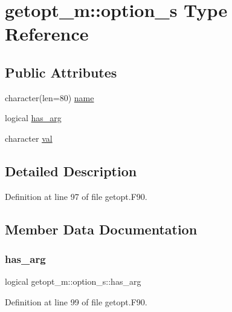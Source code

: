 \hypertarget{structgetopt__m_1_1option__s}{}\section{getopt\+\_\+m\+:\+:option\+\_\+s Type Reference}
\label{structgetopt__m_1_1option__s}
\subsection*{Public Attributes}
\begin{DoxyCompactItemize}
\item 
character(len=80) \mbox{\hyperlink{structgetopt__m_1_1option__s_a4ec49c9f40fe4c0f6e3dcc6849dea36d}{name}}
\item 
logical \mbox{\hyperlink{structgetopt__m_1_1option__s_a4620b3c1afad7dc95403eb88a4a369d6}{has\+\_\+arg}}
\item 
character \mbox{\hyperlink{structgetopt__m_1_1option__s_a25ab80bd4f202b256c65c31ea7d1798b}{val}}
\end{DoxyCompactItemize}


\subsection{Detailed Description}


Definition at line 97 of file getopt.\+F90.



\subsection{Member Data Documentation}
\mbox{\label{structgetopt__m_1_1option__s_a4620b3c1afad7dc95403eb88a4a369d6}} 
\subsubsection{\texorpdfstring{has\+\_\+arg}{has\_arg}}
{\footnotesize\ttfamily logical getopt\+\_\+m\+::option\+\_\+s\+::has\+\_\+arg}



Definition at line 99 of file getopt.\+F90.

\mbox{\label{structgetopt__m_1_1option__s_a4ec49c9f40fe4c0f6e3dcc6849dea36d}} 
